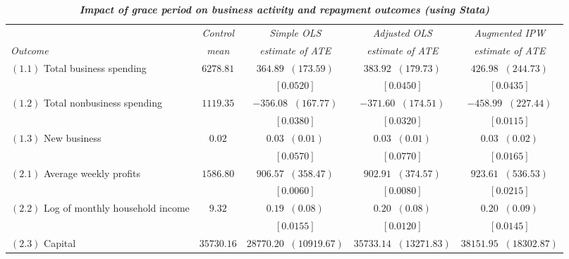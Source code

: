 \begin{table}[!ht]
\begin{center}
\caption{\textit{\textbf{Impact of grace period on business activity and repayment outcomes (using Stata)}}}
\label{table:table_single_pvals_stata}
\scriptsize \vspace{2mm}
\begin{tabular}{l|c@{\hskip 10pt}|c@{\hskip 10pt}|c@{\hskip 10pt}|c}
\hline\hline
 & \textit{Control} & \textit{Simple OLS} & \textit{Adjusted OLS} & \textit{Augmented IPW}  \\ [-1mm]
 \textit{Outcome} & \textit{mean} & \textit{estimate of ATE} & \textit{estimate of ATE} & \textit{estimate of ATE}  \\ \hline \hline
 $ (1.1) $ Total business spending & $ 6278.81 $ & $ 364.89  \;\; ( 173.59 ) $  & $ 383.92  \;\; ( 179.73 ) $  & $ 426.98  \;\; ( 244.73 ) $  \\ [-1mm] 
  &  & $ [ \mathbf { 0.0520 } ] $ & $ [ \mathbf { 0.0450 } ] $ & $ [ \mathbf { 0.0435 } ] $ \\ \hline 
 $ (1.2) $ Total nonbusiness spending & $ 1119.35 $ & $ -356.08  \;\; ( 167.77 ) $  & $ -371.60  \;\; ( 174.51 ) $  & $ -458.99  \;\; ( 227.44 ) $  \\ [-1mm] 
  &  & $ [ \mathbf { 0.0380 } ] $ & $ [ \mathbf { 0.0320 } ] $ & $ [ \mathbf { 0.0115 } ] $ \\ \hline 
 $ (1.3) $ New business & $  0.02 $ & $  0.03  \;\; (  0.01 ) $  & $  0.03  \;\; (  0.01 ) $  & $  0.03  \;\; (  0.02 ) $  \\ [-1mm] 
  &  & $ [ \mathbf { 0.0570 } ] $ & $ [ \mathbf { 0.0770 } ] $ & $ [ \mathbf { 0.0165 } ] $ \\ \hline 
\hline
 $ (2.1) $ Average weekly profits & $ 1586.80 $ & $ 906.57  \;\; ( 358.47 ) $  & $ 902.91  \;\; ( 374.57 ) $  & $ 923.61  \;\; ( 536.53 ) $  \\ [-1mm] 
  &  & $ [ \mathbf { 0.0060 } ] $ & $ [ \mathbf { 0.0080 } ] $ & $ [ \mathbf { 0.0215 } ] $ \\ \hline 
 $ (2.2) $ Log of monthly household income & $  9.32 $ & $  0.19  \;\; (  0.08 ) $  & $  0.20  \;\; (  0.08 ) $  & $  0.20  \;\; (  0.09 ) $  \\ [-1mm] 
  &  & $ [ \mathbf { 0.0155 } ] $ & $ [ \mathbf { 0.0120 } ] $ & $ [ \mathbf { 0.0145 } ] $ \\ \hline 
 $ (2.3) $ Capital & $ 35730.16 $ & $ 28770.20  \;\; ( 10919.67 ) $  & $ 35733.14  \;\; ( 13271.83 ) $  & $ 38151.95  \;\; ( 18302.87 ) $  \\ [-1mm] 

\end{tabular}
\end{center}
\end{table}
